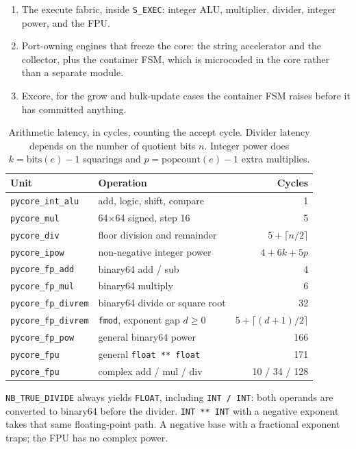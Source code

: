 \documentclass[11pt,a4paper]{article}
\begin{document}
\begin{enumerate}
\item The execute fabric, inside \texttt{S\_EXEC}: integer ALU, multiplier,
      divider, integer power, and the FPU.
\item Port-owning engines that freeze the core: the string accelerator and
      the collector, plus the container FSM, which is microcoded in the
      core rather than a separate module.
\item Excore, for the grow and bulk-update cases the container FSM raises
      before it has committed anything.
\end{enumerate}



\begin{table}[htbp]
\centering
\caption{Arithmetic latency, in cycles, counting the accept cycle.
Divider latency depends on the number of quotient bits $n$.
Integer power does $k = \mathrm{bits}(e)-1$ squarings and
$p = \mathrm{popcount}(e)-1$ extra multiplies.}
\label{tab:lat}
\small
\begin{tabular}{@{}llr@{}}
\toprule
Unit & Operation & Cycles \\
\midrule
\texttt{pycore\_int\_alu} & add, logic, shift, compare & 1 \\
\texttt{pycore\_mul} & 64$\times$64 signed, step 16 & 5 \\
\texttt{pycore\_div} & floor division and remainder & $5 + \lceil n/2 \rceil$ \\
\texttt{pycore\_ipow} & non-negative integer power & $4 + 6k + 5p$ \\
\texttt{pycore\_fp\_add} & binary64 add / sub & 4 \\
\texttt{pycore\_fp\_mul} & binary64 multiply & 6 \\
\texttt{pycore\_fp\_divrem} & binary64 divide or square root & 32 \\
\texttt{pycore\_fp\_divrem} & \texttt{fmod}, exponent gap $d \ge 0$ & $5 + \lceil(d+1)/2\rceil$ \\
\texttt{pycore\_fp\_pow} & general binary64 power & 166 \\
\texttt{pycore\_fpu} & general \texttt{float ** float} & 171 \\
\texttt{pycore\_fpu} & complex add / mul / div & 10 / 34 / 128 \\
\bottomrule
\end{tabular}
\end{table}

\texttt{NB\_TRUE\_DIVIDE} always yields \texttt{FLOAT}, including
\texttt{INT / INT}: both operands are converted to binary64 before the
divider.
\texttt{INT ** INT} with a negative exponent takes that same floating-point
path.
A negative base with a fractional exponent traps; the FPU has no complex power.
\end{document}
